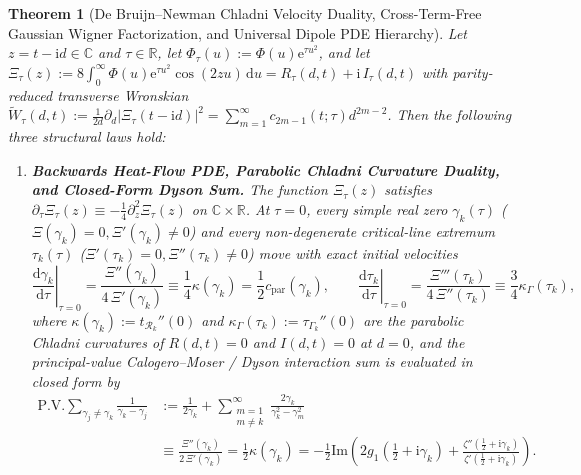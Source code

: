 \documentclass[11pt,reqno]{amsart}
\newtheorem{theorem}{Theorem}[section]
\theoremstyle{definition}
\theoremstyle{remark}
\numberwithin{equation}{section}
\newcommand{\R}{\mathbb{R}}
\newcommand{\C}{\mathbb{C}}
\newcommand{\dd}{\mathrm{d}}
\newcommand{\ee}{\mathrm{e}}
\newcommand{\ii}{\mathrm{i}}
\newcommand{\Ima}{\mathrm{Im}}
\newcommand{\PV}{\mathrm{P.V.}}
\begin{document}
\begin{theorem}[De Bruijn--Newman Chladni Velocity Duality, Cross-Term-Free Gaussian Wigner Factorization, and Universal Dipole PDE Hierarchy]\label{thm:main}
Let $z = t - \ii d \in \C$ and $\tau \in \R$, let $\Phi_\tau(u) := \Phi(u)\ee^{\tau u^2}$, and let $\Xi_\tau(z) := 8\int_0^\infty \Phi(u)\ee^{\tau u^2}\cos(2zu)\,\dd u = R_\tau(d,t) + \ii\,I_\tau(d,t)$ with parity-reduced transverse Wronskian $\widetilde{W}_\tau(d,t) := \frac{1}{2d}\partial_d|\Xi_\tau(t-\ii d)|^2 = \sum_{m=1}^\infty c_{2m-1}(t;\tau)d^{2m-2}$. Then the following three structural laws hold:
\begin{enumerate}[label=\textup{(\roman*)},leftmargin=2.2em]
\item \textbf{Backwards Heat-Flow PDE, Parabolic Chladni Curvature Duality, and Closed-Form Dyson Sum.} The function $\Xi_\tau(z)$ satisfies $\partial_\tau\Xi_\tau(z) \equiv -\frac{1}{4}\partial_z^2\Xi_\tau(z)$ on $\C\times\R$. At $\tau = 0$, every simple real zero $\gamma_k(\tau)$ ($\Xi(\gamma_k) = 0, \Xi'(\gamma_k) \neq 0$) and every non-degenerate critical-line extremum $\tau_k(\tau)$ ($\Xi'(\tau_k) = 0, \Xi''(\tau_k) \neq 0$) move with exact initial velocities
\begin{equation}\label{eq:intro_velocity_duality}
\left.\frac{\dd\gamma_k}{\dd\tau}\right|_{\tau=0} = \frac{\Xi''(\gamma_k)}{4\,\Xi'(\gamma_k)} \equiv \frac{1}{4}\kappa(\gamma_k) = \frac{1}{2}c_{\mathrm{par}}(\gamma_k), \qquad \left.\frac{\dd\tau_k}{\dd\tau}\right|_{\tau=0} = \frac{\Xi'''(\tau_k)}{4\,\Xi''(\tau_k)} \equiv \frac{3}{4}\kappa_\Gamma(\tau_k),
\end{equation}
where $\kappa(\gamma_k) := t_{\mathcal{R}_k}''(0)$ and $\kappa_\Gamma(\tau_k) := \tau_{\Gamma_k}''(0)$ are the parabolic Chladni curvatures of $R(d,t) = 0$ and $I(d,t) = 0$ at $d = 0$, and the principal-value Calogero--Moser / Dyson interaction sum is evaluated in closed form by
\begin{equation}\label{eq:intro_dyson_closed}
\begin{aligned}
\PV\sum_{\gamma_j \neq \gamma_k} \frac{1}{\gamma_k - \gamma_j} &:= \frac{1}{2\gamma_k} + \sum_{\substack{m=1 \\ m \neq k}}^{\infty} \frac{2\gamma_k}{\gamma_k^2 - \gamma_m^2} \\
&\equiv \frac{\Xi''(\gamma_k)}{2\,\Xi'(\gamma_k)} = \frac{1}{2}\kappa(\gamma_k) = -\frac{1}{2}\Ima\!\left(2g_1\!\left(\tfrac{1}{2}+\ii\gamma_k\right) + \frac{\zeta''(\frac{1}{2}+\ii\gamma_k)}{\zeta'(\frac{1}{2}+\ii\gamma_k)}\right).
\end{aligned}

\end{equation}
\end{enumerate}
\end{theorem}
\end{document}
